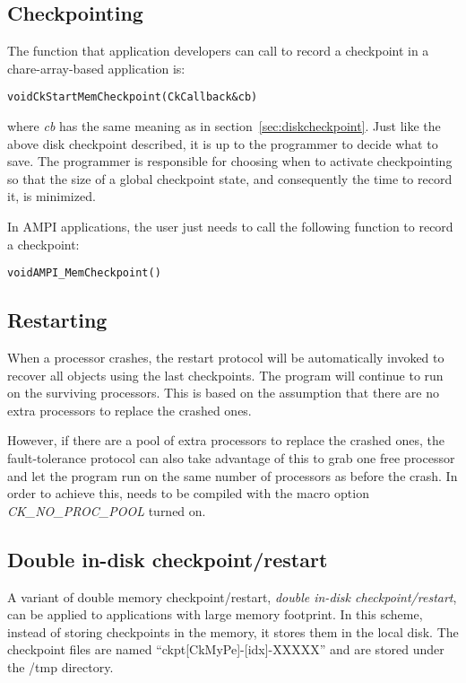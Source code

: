 \subsection{Checkpointing}

The function that application developers can call to record a checkpoint in a
chare-array-based application is:
\begin{alltt}
      void CkStartMemCheckpoint(CkCallback &cb)
\end{alltt}
where {\it cb} has the same meaning as in
section~\ref{sec:diskcheckpoint}.  Just like the above disk checkpoint
described, it is up to the programmer to decide what to save.  The
programmer is responsible for choosing when to activate checkpointing
so that the size of a global checkpoint state, and consequently the
time to record it, is minimized.

In AMPI applications, the user just needs to call the following
function to record a checkpoint:
\begin{alltt}
      void AMPI_MemCheckpoint()
\end{alltt}

\subsection{Restarting}

When a processor crashes, the restart protocol will be automatically
invoked to recover all objects using the last checkpoints. The program
will continue to run on the surviving processors. This is based on the
assumption that there are no extra processors to replace the crashed
ones.

However, if there are a pool of extra processors to replace the
crashed ones, the fault-tolerance protocol can also take advantage of
this to grab one free processor and let the program run on the same
number of processors as before the crash.  In order to achieve
this, \charmpp{} needs to be compiled with the macro option {\it
CK\_NO\_PROC\_POOL} turned on.

\subsection{Double in-disk checkpoint/restart}

A variant of double memory checkpoint/restart, {\it double in-disk
checkpoint/restart}, can be applied to applications with large memory
footprint.  In this scheme, instead of storing checkpoints in the
memory, it stores them in the local disk.  The checkpoint files are
named ``ckpt[CkMyPe]-[idx]-XXXXX'' and are stored under the /tmp
directory.


